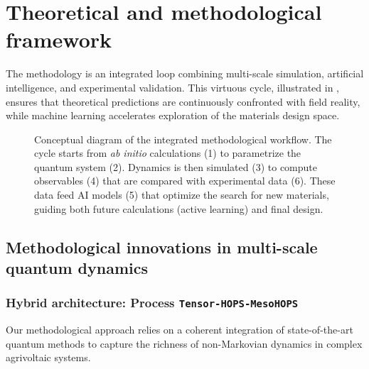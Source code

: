 \documentclass[12pt, a4paper]{article}
\begin{document}
\section{Theoretical and methodological framework}

The methodology is an integrated loop combining multi-scale simulation, artificial intelligence, and experimental validation. This virtuous cycle, illustrated in , ensures that theoretical predictions are continuously confronted with field reality, while machine learning accelerates exploration of the materials design space.

\begin{figure}[htb]
\centering
\caption{Conceptual diagram of the integrated methodological workflow. The cycle starts from \textit{ab initio} calculations (1) to parametrize the quantum system (2). Dynamics is then simulated (3) to compute observables (4) that are compared with experimental data (6). These data feed AI models (5) that optimize the search for new materials, guiding both future calculations (active learning) and final design.}
\label{fig_workflow_methodo}
\medspace

\end{figure}

\subsection{Methodological innovations in multi-scale quantum dynamics}

\subsubsection{Hybrid architecture: Process \texttt{Tensor-HOPS-MesoHOPS}}

Our methodological approach relies on a coherent integration of state-of-the-art quantum methods to capture the richness of non-Markovian dynamics in complex agrivoltaic systems.
\end{document}
